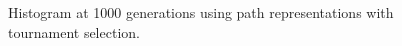 \begin{figure}[!]
\centering
 
 \caption{Histogram at 1000 generations using path representations with tournament selection.}
 \label{fig:tourn_hist}
\end{figure}

\FloatBarrier